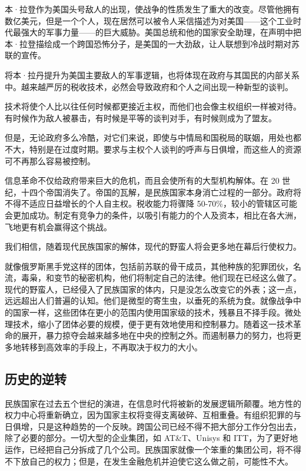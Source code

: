 本·拉登作为美国头号敌人的出现，使战争的性质发生了重大的改变。尽管他拥有数亿美元，但是一个个人，现在居然可以被令人采信描述为对美国——这个工业时代最强大的军事力量——的巨大威胁。美国总统和他的国家安全助理，在声明中把本·拉登描绘成一个跨国恐怖分子，是美国的一大劲敌，让人联想到冷战时期对苏联的宣传。


将本·拉丹提升为美国主要敌人的军事逻辑，也将体现在政府与其国民的内部关系中。越来越严厉的税收技术，必然会导致政府和个人之间出现一种新型的谈判。


技术将使个人比以往任何时候都更接近主权，而他们也会像主权组织一样被对待。有时候作为敌人被暴击，有时候是平等的谈判对手，有时候则成为了盟友。


但是，无论政府多么冷酷，对它们来说，即使与中情局和国税局的联姻，用处也都不大，特别是在过度时期。要求与主权个人谈判的呼声与日俱增，而这些人的资源可不再那么容易被控制。


信息革命不仅给政府带来巨大的危机，而且会使所有的大型机构解体。在 20 世纪，十四个帝国消失了。帝国的瓦解，是民族国家本身消亡过程的一部分。政府将不得不适应日益增长的个人自主权。税收能力将骤降 50-70\%，较小的管辖区可能会更加成功。制定有竞争力的条件，以吸引有能力的个人及资本，相比在各大洲，飞地更有机会赢得这个挑战。


我们相信，随着现代民族国家的解体，现代的野蛮人将会更多地在幕后行使权力。


就像俄罗斯黑手党这样的团体，包括前苏联的骨干成员，其他种族的犯罪团伙，名流，毒枭，和变节的秘密机构，他们将制定自己的法律。他们现在已经这么做了。现代的野蛮人，已经侵入了民族国家的体内，只是没怎么改变它的外表；这一点，远远超出人们普遍的认知。他们是微型的寄生虫，以垂死的系统为食。就像战争中的国家一样，这些团体在更小的范围内使用国家级的技术，残暴且不择手段。微处理技术，缩小了团体必要的规模，便于更有效地使用和控制暴力。随着这一技术革命的展开，暴力掠夺会越来越多地在中央的控制之外。而遏制暴力的努力，也将更多地转移到高效率的手段上，不再取决于权力的大小。



\subsection{历史的逆转}

民族国家在过去五个世纪的演进，在信息时代将被新的发展逻辑所颠覆。地方性的权力中心将重新确立，因为国家主权将变得支离破碎、互相重叠。有组织犯罪的与日俱增，只是这种趋势的一个反映。跨国公司已经不得不把大部分工作分包出去，除了必要的部分。一切大型的企业集团，如 AT\&T、Unisys 和 ITT，为了更好地运作，已经把自己分拆成了几个公司。民族国家就像一个笨重的集团公司，将不得不下放自己的权力；但是，在发生金融危机并迫使它这么做之前，可能性不大。


